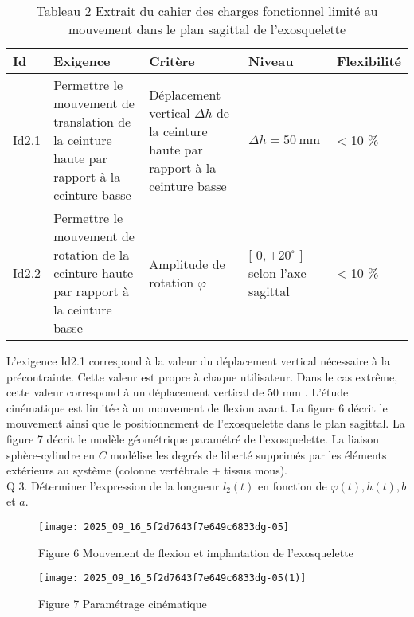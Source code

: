 \begin{table}[h]
\begin{center}
\begin{tabular}{|l|l|l|l|l|}
\hline
Id & Exigence & Critère & Niveau & Flexibilité \\
\hline
Id2.1 & Permettre le mouvement de translation de la ceinture haute par rapport à la ceinture basse & Déplacement vertical $\Delta h$ de la ceinture haute par rapport à la ceinture basse & $\Delta h=50 \mathrm{~mm}$ & < 10 \% \\
\hline
Id2.2 & Permettre le mouvement de rotation de la ceinture haute par rapport à la ceinture basse & Amplitude de rotation $\varphi$ & [ $0,+20^{\circ}$ ] selon l'axe sagittal & < 10 \% \\
\hline
\end{tabular}
\captionsetup{labelformat=empty}
\caption{Tableau 2 Extrait du cahier des charges fonctionnel limité au mouvement dans le plan sagittal de l'exosquelette}
\end{center}
\end{table}

L'exigence Id2.1 correspond à la valeur du déplacement vertical nécessaire à la précontrainte. Cette valeur est propre à chaque utilisateur. Dans le cas extrême, cette valeur correspond à un déplacement vertical de 50 mm . L'étude cinématique est limitée à un mouvement de flexion avant. La figure 6 décrit le mouvement ainsi que le positionnement de l'exosquelette dans le plan sagittal. La figure 7 décrit le modèle géométrique paramétré de l'exosquelette. La liaison sphère-cylindre en $C$ modélise les degrés de liberté supprimés par les éléments extérieurs au système (colonne vertébrale + tissus mous).\\
Q 3. Déterminer l'expression de la longueur $l_{2}(t)$ en fonction de $\varphi(t), h(t), b$ et $a$.

\begin{figure}[h]
\begin{center}
  \texttt{[image: 2025\_09\_16\_5f2d7643f7e649c6833dg-05]}
\captionsetup{labelformat=empty}
\caption{Figure 6 Mouvement de flexion et implantation de l'exosquelette}
\end{center}
\end{figure}

\begin{figure}[h]
\begin{center}
  \texttt{[image: 2025\_09\_16\_5f2d7643f7e649c6833dg-05(1)]}
\captionsetup{labelformat=empty}
\caption{Figure 7 Paramétrage cinématique}
\end{center}
\end{figure}

